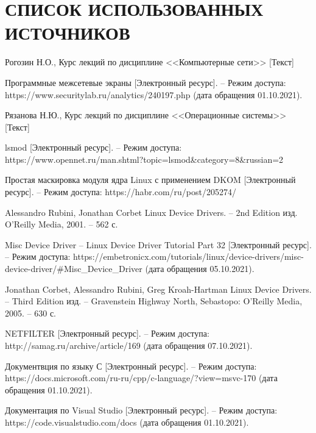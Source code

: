 \section*{СПИСОК ИСПОЛЬЗОВАННЫХ ИСТОЧНИКОВ}

\begin{thebibliography}{9}
	 Рогозин Н.О., Курс лекций по дисциплине <<Компьютерные сети>> [Текст]
	
	 Программные межсетевые экраны [Электронный ресурс]. -- Режим доступа: https://www.securitylab.ru/analytics/240197.php (дата обращения 01.10.2021).
	
	 Рязанова Н.Ю., Курс лекций по дисциплине <<Операционные системы>> [Текст]
	
	 lsmod [Электронный ресурс]. -- Режим доступа: https://www.opennet.ru/man.shtml?topic=lsmod\&category=8\&russian=2
	
	 Простая маскировка модуля ядра Linux с применением DKOM [Электронный ресурс]. -- Режим доступа: https://habr.com/ru/post/205274/
	
	 Alessandro Rubini, Jonathan Corbet Linux Device Drivers. -- 2nd Edition изд. O'Reilly Media, 2001. -- 562 с.
	
	 Misc Device Driver -- Linux Device Driver Tutorial Part 32 [Электронный ресурс]. --  Режим доступа: https://embetronicx.com/tutorials/linux/device-drivers/misc-device-driver/\#Misc\_Device\_Driver (дата обращения 05.10.2021).
	
	 Jonathan Corbet, Alessandro Rubini, Greg Kroah-Hartman Linux Device Drivers. -- Third Edition изд. --  Gravenstein Highway North, Sebastopo:  O’Reilly Media, 2005. -- 630 с.
	
	 NETFILTER [Электронный ресурс]. -- Режим доступа: http://samag.ru/archive/article/169 (дата обращения 07.10.2021).
	
	 Документвция по языку С [Электронный ресурс]. -- Режим доступа: https://docs.microsoft.com/ru-ru/cpp/c-language/?view=msvc-170 (дата обращения 01.10.2021).
	
	 Документация по Visual Studio [Электронный ресурс]. -- Режим доступа:  https://code.visualstudio.com/docs (дата обращения 01.10.2021).
	
\end{thebibliography}
		
		
